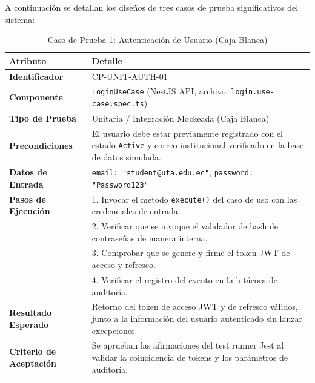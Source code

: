 \documentclass{article}
\begin{document}
A continuación se detallan los diseños de tres casos de prueba significativos del sistema:

\begin{table}[H]
\centering
\small
\caption{Caso de Prueba 1: Autenticación de Usuario (Caja Blanca)}
\begin{tabularx}{\linewidth}{p{4cm} X}
\toprule
\textbf{Atributo} & \textbf{Detalle} \\
\midrule
\textbf{Identificador} & CP-UNIT-AUTH-01 \\
\textbf{Componente} & \texttt{LoginUseCase} (NestJS API, archivo: \texttt{login.use-case.spec.ts}) \\
\textbf{Tipo de Prueba} & Unitaria / Integración Mockeada (Caja Blanca) \\
\textbf{Precondiciones} & El usuario debe estar previamente registrado con el estado \texttt{Active} y correo institucional verificado en la base de datos simulada. \\
\textbf{Datos de Entrada} & \texttt{email: "student@uta.edu.ec"}, \texttt{password: "Password123"} \\
\textbf{Pasos de Ejecución} & 1. Invocar el método \texttt{execute()} del caso de uso con las credenciales de entrada.\\
& 2. Verificar que se invoque el validador de hash de contraseñas de manera interna.\\
& 3. Comprobar que se genere y firme el token JWT de acceso y refresco. \\
& 4. Verificar el registro del evento en la bitácora de auditoría.\\
\textbf{Resultado Esperado} & Retorno del token de acceso JWT y de refresco válidos, junto a la información del usuario autenticado sin lanzar excepciones. \\
\textbf{Criterio de Aceptación} & Se aprueban las afirmaciones del test runner Jest al validar la coincidencia de tokens y los parámetros de auditoría. \\
\bottomrule
\end{tabularx}
\end{table}
\end{document}
